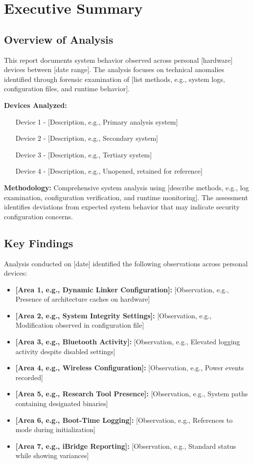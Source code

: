\documentclass[11pt, a4paper]{article}
\begin{document}

\section{Executive Summary}

\subsection{Overview of Analysis}
This report documents system behavior observed across personal [hardware] devices between [date range]. The analysis focuses on technical anomalies identified through forensic examination of [list methods, e.g., system logs, configuration files, and runtime behavior].

\textbf{Devices Analyzed:}
\begin{itemize}
    \item [Device 1] - [Description, e.g., Primary analysis system]
    \item [Device 2] - [Description, e.g., Secondary system]
    \item [Device 3] - [Description, e.g., Tertiary system]
    \item [Device 4] - [Description, e.g., Unopened, retained for reference]
\end{itemize}

\textbf{Methodology:} Comprehensive system analysis using [describe methods, e.g., log examination, configuration verification, and runtime monitoring]. The assessment identifies deviations from expected system behavior that may indicate security configuration concerns.

\subsection{Key Findings}
Analysis conducted on [date] identified the following observations across personal devices:

\begin{itemize}
    \item \textbf{[Area 1, e.g., Dynamic Linker Configuration]:} [Observation, e.g., Presence of architecture caches on hardware]
    \item \textbf{[Area 2, e.g., System Integrity Settings]:} [Observation, e.g., Modification observed in configuration file]
    \item \textbf{[Area 3, e.g., Bluetooth Activity]:} [Observation, e.g., Elevated logging activity despite disabled settings]
    \item \textbf{[Area 4, e.g., Wireless Configuration]:} [Observation, e.g., Power events recorded]
    \item \textbf{[Area 5, e.g., Research Tool Presence]:} [Observation, e.g., System paths containing designated binaries]
    \item \textbf{[Area 6, e.g., Boot-Time Logging]:} [Observation, e.g., References to mode during initialization]
    \item \textbf{[Area 7, e.g., iBridge Reporting]:} [Observation, e.g., Standard status while showing variances]
\end{itemize}
\end{document}
